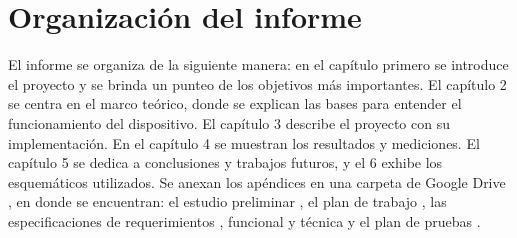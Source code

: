 \section{Organización del informe}
El informe se organiza de la siguiente manera: en el capítulo primero se introduce el proyecto y se brinda un punteo de los objetivos más importantes. El capítulo 2 se centra en el marco teórico, donde se explican las bases para entender el funcionamiento del dispositivo. El capítulo 3 describe el proyecto con su implementación. En el capítulo 4 se muestran los resultados y mediciones. El capítulo 5 se dedica a conclusiones y trabajos futuros, y el 6 exhibe los esquemáticos utilizados. Se anexan los apéndices en una carpeta de Google Drive \cite{documentacion}, en donde se encuentran: el estudio preliminar \cite{EP}, el plan de trabajo \cite{PProy}, las especificaciones de requerimientos \cite{ER}, funcional \cite{EF} y técnica \cite{ET} y el plan de pruebas \cite{PP}. 

